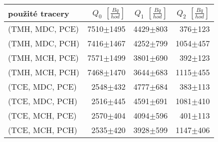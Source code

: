 \begin{tabular}{lrrr}
\toprule
použité tracery& $Q_0$ $\left[\si{\frac{Bq}{hod}}\right]$ & $Q_1$ $\left[\si{\frac{Bq}{hod}}\right]$ & $Q_2$ $\left[\si{\frac{Bq}{hod}}\right]$ \\
\midrule
(TMH, MDC, PCE) &7510$\pm$1495 &  4429$\pm$803 &  376$\pm$123 \\
(TMH, MDC, PCH) &7416$\pm$1467 &  4252$\pm$799 & 1054$\pm$457 \\
(TMH, MCH, PCE) &7571$\pm$1499 &  3801$\pm$690 &  392$\pm$123 \\
(TMH, MCH, PCH) &7468$\pm$1470 &  3644$\pm$683 & 1115$\pm$455 \\
(TCE, MDC, PCE) & 2548$\pm$432 &  4777$\pm$684 &  383$\pm$113 \\
(TCE, MDC, PCH) & 2516$\pm$445 &  4591$\pm$691 & 1081$\pm$410 \\
(TCE, MCH, PCE) & 2570$\pm$404 &  4094$\pm$596 &  401$\pm$113 \\
(TCE, MCH, PCH) & 2535$\pm$420 &  3928$\pm$599 & 1147$\pm$406 \\
\bottomrule
\end{tabular}
